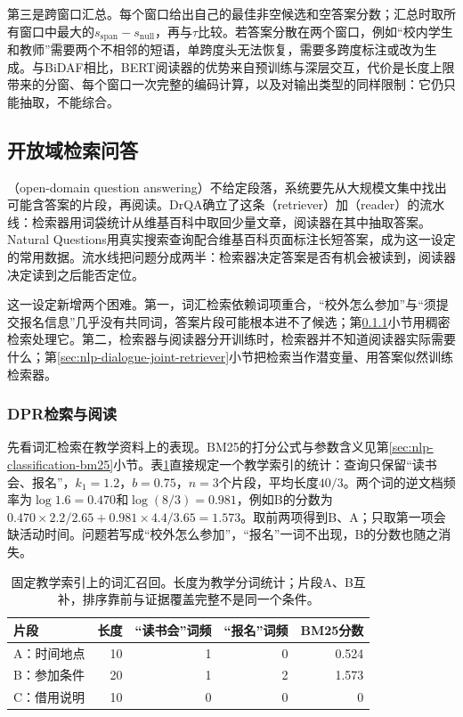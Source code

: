 第三是跨窗口汇总。每个窗口给出自己的最佳非空候选和空答案分数；汇总时取所有窗口中最大的$s_{\mathrm{span}}-s_{\mathrm{null}}$，再与$\tau$比较。若答案分散在两个窗口，例如“校内学生和教师”需要两个不相邻的短语，单跨度头无法恢复，需要多跨度标注或改为生成。与BiDAF相比，BERT阅读器的优势来自预训练与深层交互，代价是长度上限带来的分窗、每个窗口一次完整的编码计算，以及对输出类型的同样限制：它仍只能抽取，不能综合。

\subsection{开放域检索问答}
\label{sec:nlp-dialogue-open-domain}

（open-domain question answering）不给定段落，系统要先从大规模文集中找出可能含答案的片段，再阅读。DrQA确立了这条（retriever）加（reader）的流水线：检索器用词袋统计从维基百科中取回少量文章，阅读器在其中抽取答案。Natural Questions用真实搜索查询配合维基百科页面标注长短答案，成为这一设定的常用数据。流水线把问题分成两半：检索器决定答案是否有机会被读到，阅读器决定读到之后能否定位。

这一设定新增两个困难。第一，词汇检索依赖词项重合，“校外怎么参加”与“须提交报名信息”几乎没有共同词，答案片段可能根本进不了候选；第\ref{sec:nlp-dialogue-dpr}小节用稠密检索处理它。第二，检索器与阅读器分开训练时，检索器并不知道阅读器实际需要什么；第\ref{sec:nlp-dialogue-joint-retriever}小节把检索当作潜变量、用答案似然训练检索器。

\subsubsection{DPR检索与阅读}
\label{sec:nlp-dialogue-dpr}

先看词汇检索在教学资料上的表现。BM25的打分公式与参数含义见第\ref{sec:nlp-classification-bm25}小节。表\ref{tab:nlp-dialogue-retrieval}直接规定一个教学索引的统计：查询只保留“读书会、报名”，$k_1=1.2$，$b=0.75$，$n=3$个片段，平均长度$40/3$。两个词的逆文档频率为$\log1.6=0.470$和$\log(8/3)=0.981$，例如B的分数为$0.470\times2.2/2.65+0.981\times4.4/3.65=1.573$。取前两项得到B、A；只取第一项会缺活动时间。问题若写成“校外怎么参加”，“报名”一词不出现，B的分数也随之消失。

\begin{table}[htbp]
  \centering
  \begin{tabular}{lrrrr}
    \toprule
    片段 & 长度 & “读书会”词频 & “报名”词频 & BM25分数\\
    \midrule
    A：时间地点 & 10 & 1 & 0 & 0.524\\
    B：参加条件 & 20 & 1 & 2 & 1.573\\
    C：借用说明 & 10 & 0 & 0 & 0\\
    \bottomrule
  \end{tabular}
  \caption{固定教学索引上的词汇召回。长度为教学分词统计；片段A、B互补，排序靠前与证据覆盖完整不是同一个条件。}
  \label{tab:nlp-dialogue-retrieval}
\end{table}

